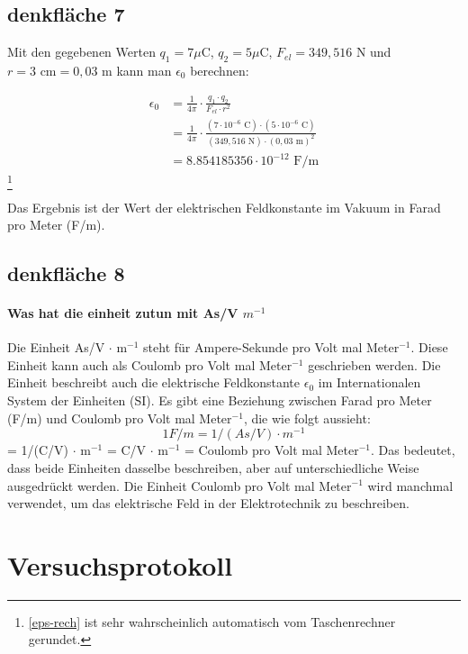 \documentclass[a4paper]{report}
\begin{document}
\subsection{denkfläche 7}
Mit den gegebenen Werten $q_1=7\mu\text{C}$, $q_2=5\mu\text{C}$, $F_{el}=349,516\text{ N}$ und $r=3\text{ cm}=0,03\text{ m}$ kann man $\epsilon_0$ berechnen:

\begin{align}
\epsilon_0 &= \frac{1}{4\pi} \cdot \frac{q_1 \cdot q_2}{F_{el} \cdot r^2} \\
&= \frac{1}{4\pi} \cdot \frac{(7\cdot 10^{-6}\text{ C}) \cdot (5\cdot 10^{-6}\text{ C})}{(349,516\text{ N}) \cdot (0,03\text{ m})^2} \\
&= 8.854185356\cdot 10^{-12}\text{ F/m} \label{eps-rech}
\end{align}
\footnote{\ref{eps-rech} ist sehr wahrscheinlich automatisch vom Taschenrechner gerundet.}

Das Ergebnis ist der Wert der elektrischen Feldkonstante im Vakuum in Farad pro Meter (F/m).

\subsection{denkfläche 8}
\paragraph{Was hat die einheit zutun mit As/V $m^{-1}$}

Die Einheit As/V $\cdot$ m$^{-1}$ steht für Ampere-Sekunde pro Volt mal
Meter$^{-1}$. Diese Einheit kann auch als Coulomb pro Volt mal Meter$^{-1}$
geschrieben werden. Die Einheit beschreibt auch die elektrische Feldkonstante
$\epsilon_0$ im Internationalen System der Einheiten (SI).
Es gibt eine Beziehung zwischen Farad pro Meter (F/m) und Coulomb pro Volt mal
Meter$^{-1}$, die wie folgt aussieht:
$$1 F/m = 1/(As/V) \cdot m^{-1} $$ 
= 1/(C/V) $\cdot$ m$^{-1}$ = C/V $\cdot$ m$^{-1}$ = Coulomb pro Volt mal Meter$^{-1}$.
Das bedeutet, dass beide Einheiten dasselbe beschreiben, aber auf
unterschiedliche Weise ausgedrückt werden. Die Einheit Coulomb pro Volt mal
Meter$^{-1}$ wird manchmal verwendet, um das elektrische Feld in der
Elektrotechnik zu beschreiben.

\clearpage
\section{Versuchsprotokoll}
\end{document}
